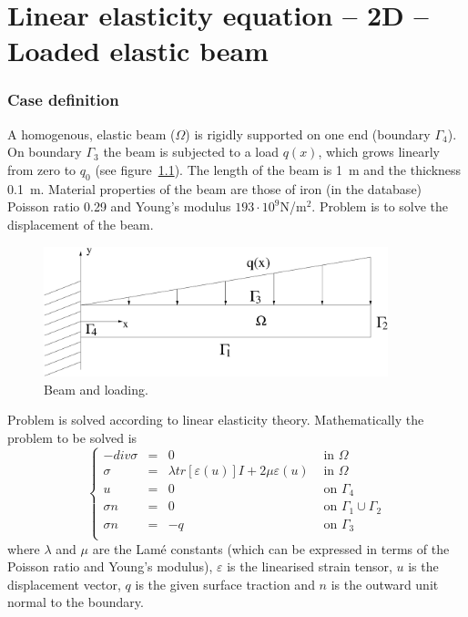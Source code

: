 \chapter{Linear elasticity equation -- 2D -- Loaded elastic beam}



\subsection*{Case definition}

A homogenous, elastic beam ($\Omega$) is rigidly supported on one 
end (boundary $\Gamma_4$). On boundary $\Gamma_3$ the beam is subjected 
to a load $q(x)$, which grows linearly from zero to $q_0$ 
(see figure~\ref{fg:beam}). The length of the beam is 1~m and the thickness 0.1~m.
Material properties of the beam are those of iron (in the database) Poisson 
ratio 0.29 and Young's modulus $193\cdot 10^9$N/m$^2$. Problem is to solve the 
displacement of the beam.  

\begin{figure}[h]
\centering
\includegraphics[width=100mm]{Beam}
\caption{Beam and loading.}\label{fg:beam}
\end{figure}

Problem is solved according to linear elasticity theory. Mathematically 
the problem to be solved is
\begin{equation}
\left \{
\begin{array}{rcll}
-div \sigma & = & 0 & \mbox{ in } \Omega \\
\sigma & = & \lambda tr [\varepsilon(u)]I + 2 \mu \varepsilon(u) &
\mbox{ in } \Omega \\
u & = & 0 & \mbox{ on } \Gamma_4 \\
\sigma n & = & 0 & \mbox{ on } \Gamma_1 \cup \Gamma_2 \\
\sigma n & = & -q & \mbox{ on } \Gamma_3 \\
\end{array}
\right .
\end{equation}
where $\lambda$ and $\mu$ are the Lam\'{e} constants (which can be expressed 
in terms of the Poisson ratio and Young's modulus), $\varepsilon$ is the 
linearised strain tensor, $u$ is the displacement vector, $q$ is the given
surface traction and $n$ is the outward unit normal to the boundary.



